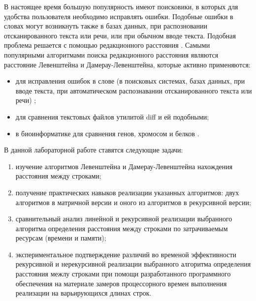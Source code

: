 \newpage
{}

В настоящее время большую популярность имеют поисковики, в которых для удобства
пользователя необходимо исправлять ошибки. Подобные ошибки в словах могут возникнуть
также в базах данных, при распозновании отсканированного текста или речи, или
при обычном вводе текста. Подобная проблема решается с помощью редакционного
расстояния \cite{habr}.
Самыми популярными алгоритмами поиска редакционного расстояния являются
расстояние Левенштейна и Дамерау-Левенштейна, которые активно применяются:

\begin{itemize}
    \item для исправления ошибок в слове (в поисковых системах, базах
        данных, при вводе текста, при автоматическом распознавании
        отсканированного текста или речи) \cite{habr};

    \item для сравнения текстовых файлов утилитой diff и ей подобными;

    \item в биоинформатике для сравнения генов, хромосом и белков \cite{bio}.
\end{itemize}

В данной лабораторной работе ставятся следующие задачи:

\begin{enumerate}
    \item изучение алгоритмов Левенштейна и Дамерау-Левенштейна нахождения
        расстояния между строками;
    \item получение практических навыков реализации указанных алгоритмов:
        двух алгоритмов в матричной версии и оного из алгоритмов в рекурсивной
        версии;
    \item сравнительный анализ линейной и рекурсивной реализации выбранного
        алгоритма определения расстояния между строками по затрачиваемым
        ресурсам (времени и памяти);
    \item экспериментальное подтверждение различий во временой эффективности
        рекурсивной и нерекурсивной реализации выбранного алгоритма
        определения расстояния межлу строками при помощи разработанного
        программного обеспечения на материале замеров процессорного времен
        выполнения реализации на варьирующихся длинах строк.
\end{enumerate}
